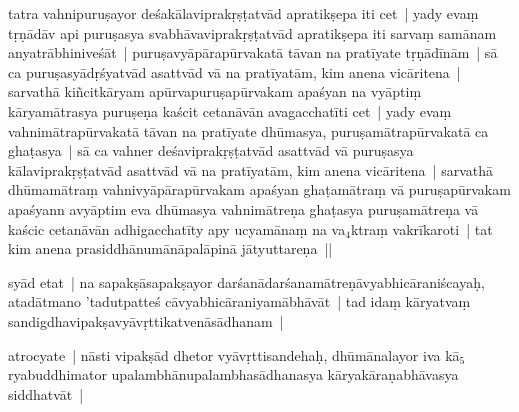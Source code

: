 \documentclass[article,12pt,a4paper]{memoir}%
\newcounter{parCount}
\begin{document}
	  
	  \pstart \leavevmode%
	\label{thakur75-37.1}tatra vahnipuruṣayor deśakālaviprakṛṣṭatvād apratikṣepa iti cet | yady evaṃ tṛṇādāv api puruṣasya svabhāvaviprakṛṣṭatvād apratikṣepa iti sarvaṃ samānam anyatrābhiniveśāt | puruṣavyāpārapūrvakatā tāvan na pratīyate tṛṇādīnām | sā ca puruṣasyādṛśyatvād asattvād vā na pratīyatām, kim anena vicāritena | sarvathā kiñcitkāryam apūrvapuruṣapūrvakam apaśyan na vyāptiṃ kāryamātrasya puruṣeṇa kaścit cetanāvān avagacchatīti cet | yady evaṃ vahnimātrapūrvakatā tāvan na pratīyate dhūmasya, puruṣamātrapūrvakatā ca ghaṭasya | sā ca vahner deśaviprakṛṣṭatvād asattvād vā puruṣasya kālaviprakṛṣṭatvād asattvād vā na pratīyatām, kim anena vicāritena | sarvathā dhūmamātraṃ vahnivyāpārapūrvakam apaśyan ghaṭamātraṃ vā puruṣapūrvakam apaśyann avyāptim eva dhūmasya vahnimātreṇa ghaṭasya puruṣamātreṇa vā kaścic cetanāvān adhigacchatīty apy ucyamānaṃ na va{\tiny $_{4}$}ktraṃ vakrīkaroti | tat kim anena prasiddhānumānāpalāpinā jātyuttareṇa ||
	{}
	\pend%
      

	  
	  \pstart \leavevmode%
	\label{thakur75-37.12}\label{rnā__96541}syād etat | na sapakṣāsapakṣayor darśanādarśanamātreṇāvyabhicāraniścayaḥ, atadātmano 'tadutpatteś cāvyabhicāraniyamābhāvāt | tad idaṃ kāryatvaṃ sandigdhavipakṣavyāvṛttikatvenāsādhanam |
	{}
	\pend%
      

	  
	  \pstart \leavevmode%
	\label{thakur75-37.14}atrocyate | nāsti vipakṣād dhetor vyāvṛttisandehaḥ, dhūmānalayor iva kā{\tiny $_{5}$}ryabuddhimator upalambhānupalambhasādhanasya \label{ratnakīrtinibandhāvali__36r1PF7IMWMOO857NALIQLRG7O8}kāryakāraṇabhāvasya siddha\label{ratnakīrtinibandhāvali__36r1PF7IMWM0G3TH23WNU1X5LKO}tvāt |
	{}
	\pend%
      
\end{document}

